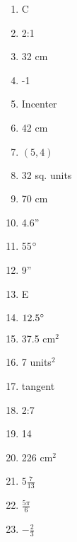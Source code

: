 \documentclass[../uilmath.tex]{subfiles}
\begin{document}
\begin{enumerate}[label=\bfseries\arabic*.]
    \item %
    C 

    \item %
    2:1 

    \item %
    32 cm

    \item %
    -1

    \item %
    Incenter 

    \item %
    42 cm 

    \item %
    $(5,4)$

    \item %
    32 sq. units 

    \item %
    70 cm 

    \item %
    4.6''

    \item %
    55$\degree$

    \item %
    9''

    \item %
    E 

    \item %
    $12.5\degree$

    \item %
    37.5 cm$^2$

    \item %
    7 units$^2$

    \item %
    tangent 

    \item %
    2:7

    \item %
    14

    \item %
    226 cm$^2$

    \item %
    $5\frac{7}{13}$

    \item %
    $\frac{5\pi}{6}$

    \item %
    $-\frac{2}{3}$


\end{enumerate}
\end{document}
